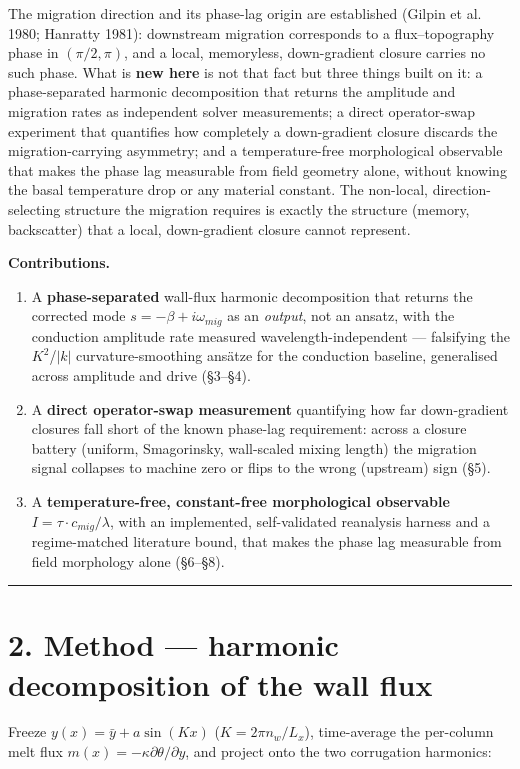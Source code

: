 \documentclass{jfm}
\begin{document}
The migration direction and its phase-lag origin are established (Gilpin et al. 1980; Hanratty 1981): downstream migration corresponds to a flux–topography phase in $(\pi /2,\pi )$, and a local, memoryless, down-gradient closure carries no such phase. What is \textbf{new here} is not that fact but three things built on it: a phase-separated harmonic decomposition that returns the amplitude and migration rates as independent solver measurements; a direct operator-swap experiment that quantifies how completely a down-gradient closure discards the migration-carrying asymmetry; and a temperature-free morphological observable that makes the phase lag measurable from field geometry alone, without knowing the basal temperature drop or any material constant. The non-local, direction-selecting structure the migration requires is exactly the structure (memory, backscatter) that a local, down-gradient closure cannot represent.


\textbf{Contributions.}

\begin{enumerate}
\item A \textbf{phase-separated} wall-flux harmonic decomposition that returns the corrected mode $s=-\beta +i\omega _{mig}$ as an \emph{output}, not an ansatz, with the conduction amplitude rate measured wavelength-independent — falsifying the $K^{2}$/$|k|$ curvature-smoothing ansätze for the conduction baseline, generalised across amplitude and drive (§3–§4).
\item A \textbf{direct operator-swap measurement} quantifying how far down-gradient closures fall short of the known phase-lag requirement: across a closure battery (uniform, Smagorinsky, wall-scaled mixing length) the migration signal collapses to machine zero or flips to the wrong (upstream) sign (§5).
\item A \textbf{temperature-free, constant-free morphological observable} $I=\tau \cdot c_{mig}/\lambda $, with an implemented, self-validated reanalysis harness and a regime-matched literature bound, that makes the phase lag measurable from field morphology alone (§6–§8).
\end{enumerate}


\medskip\hrule\medskip


\section*{2. Method — harmonic decomposition of the wall flux}


Freeze $y(x)=\bar{y}+a \sin(Kx)$ ($K=2\pi n_{w}/L_{x}$), time-average the per-column melt flux $m(x)=-\kappa  \partial \theta /\partial y$, and project onto the two corrugation harmonics:
\end{document}
